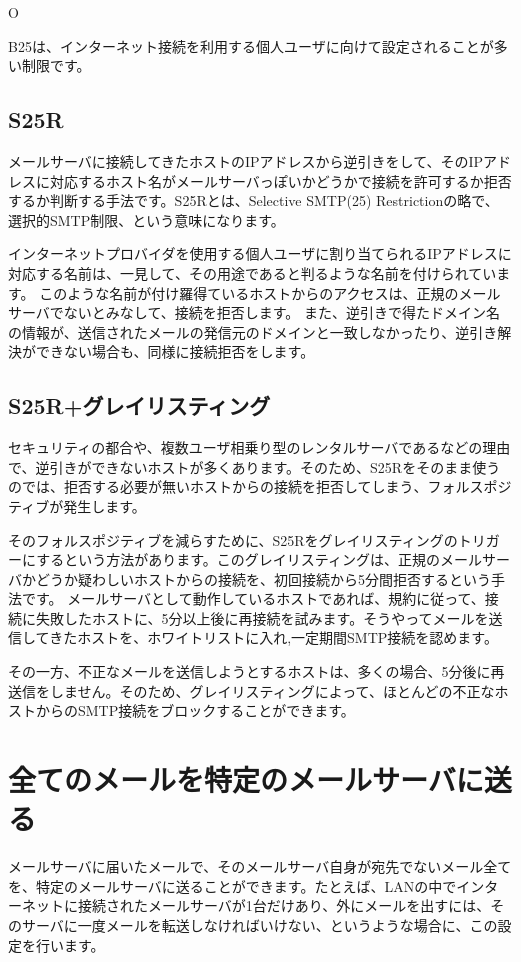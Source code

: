 O{B25は、インターネット接続を利用する個人ユーザに向けて設定されることが多い制限です。

\subsection{S25R}

メールサーバに接続してきたホストのIPアドレスから逆引きをして、そのIPアドレスに対応するホスト名がメールサーバっぽいかどうかで接続を許可するか拒否するか判断する手法です。S25Rとは、Selective SMTP(25) Restrictionの略で、選択的SMTP制限、という意味になります。

インターネットプロバイダを使用する個人ユーザに割り当てられるIPアドレスに対応する名前は、一見して、その用途であると判るような名前を付けられています。
このような名前が付け羅得ているホストからのアクセスは、正規のメールサーバでないとみなして、接続を拒否します。
また、逆引きで得たドメイン名の情報が、送信されたメールの発信元のドメインと一致しなかったり、逆引き解決ができない場合も、同様に接続拒否をします。

\subsection{S25R+グレイリスティング}
セキュリティの都合や、複数ユーザ相乗り型のレンタルサーバであるなどの理由で、逆引きができないホストが多くあります。そのため、S25Rをそのまま使うのでは、拒否する必要が無いホストからの接続を拒否してしまう、フォルスポジティブが発生します。

そのフォルスポジティブを減らすために、S25Rをグレイリスティングのトリガーにするという方法があります。このグレイリスティングは、正規のメールサーバかどうか疑わしいホストからの接続を、初回接続から5分間拒否するという手法です。
メールサーバとして動作しているホストであれば、規約に従って、接続に失敗したホストに、5分以上後に再接続を試みます。そうやってメールを送信してきたホストを、ホワイトリストに入れ,一定期間SMTP接続を認めます。

その一方、不正なメールを送信しようとするホストは、多くの場合、5分後に再送信をしません。そのため、グレイリスティングによって、ほとんどの不正なホストからのSMTP接続をブロックすることができます。




\section{全てのメールを特定のメールサーバに送る}
メールサーバに届いたメールで、そのメールサーバ自身が宛先でないメール全てを、特定のメールサーバに送ることができます。たとえば、LANの中でインターネットに接続されたメールサーバが1台だけあり、外にメールを出すには、そのサーバに一度メールを転送しなければいけない、というような場合に、この設定を行います。

}
